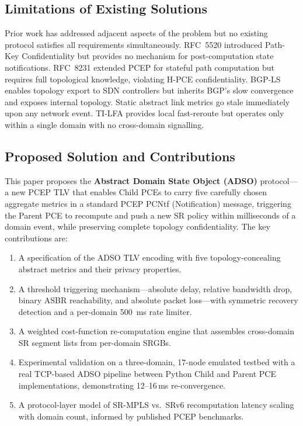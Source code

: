 \documentclass[conference]{IEEEtran}
\begin{document}
\subsection*{Limitations of Existing Solutions}

Prior work has addressed adjacent aspects of the problem but no
existing protocol satisfies all requirements simultaneously. RFC~5520
\cite{b_rfc5520} introduced Path-Key Confidentiality but provides no
mechanism for post-computation state notifications. RFC~8231
\cite{b_stateful} extended PCEP for stateful path computation but
requires full topological knowledge, violating H-PCE confidentiality.
BGP-LS \cite{b_bgpls} enables topology export to SDN controllers but
inherits BGP's slow convergence and exposes internal topology. Static
abstract link metrics \cite{b_aalen} go stale immediately upon any
network event. TI-LFA \cite{b_tilfa} provides local fast-reroute but
operates only within a single domain with no cross-domain signalling.

\subsection*{Proposed Solution and Contributions}

This paper proposes the \textbf{Abstract Domain State Object (ADSO)}
protocol---a new PCEP TLV that enables Child PCEs to carry five
carefully chosen aggregate metrics in a standard PCEP PCNtf
(Notification) message, triggering the Parent PCE to recompute and push
a new SR policy within milliseconds of a domain event, while preserving
complete topology confidentiality. The key contributions are:

\begin{enumerate}
  \item A specification of the ADSO TLV encoding with five
        topology-concealing abstract metrics and their privacy
        properties.
  \item A threshold triggering mechanism---absolute delay, relative
        bandwidth drop, binary ASBR reachability, and absolute packet
        loss---with symmetric recovery detection and a per-domain
        500~ms rate limiter.
  \item A weighted cost-function re-computation engine that assembles
        cross-domain SR segment lists from per-domain SRGBs.
  \item Experimental validation on a three-domain, 17-node emulated
        testbed with a real TCP-based ADSO pipeline between Python
        Child and Parent PCE implementations, demonstrating
        12--16\,ms re-convergence.
  \item A protocol-layer model of SR-MPLS vs.\ SRv6 recomputation
        latency scaling with domain count, informed by published
        PCEP benchmarks.
\end{enumerate}
\end{document}
